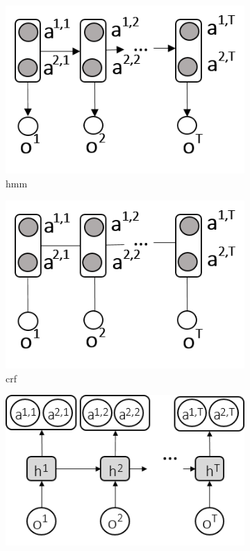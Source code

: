 \begin{figure}[ht]
  \begin{subfigure}{0.32\textwidth}
    \includegraphics[width=1\textwidth]{ghmm.png}
    \caption{hmm}
    \label{hmm}
  \end{subfigure}
  \begin{subfigure}{0.32\textwidth}
    \includegraphics[width=1\textwidth]{gcrf.png}
    \caption{crf}
    \label{crf}
  \end{subfigure}
  \begin{subfigure}{0.32\textwidth}
    \includegraphics[width=1\textwidth]{grnn.png}

\end{subfigure}
\end{figure}
